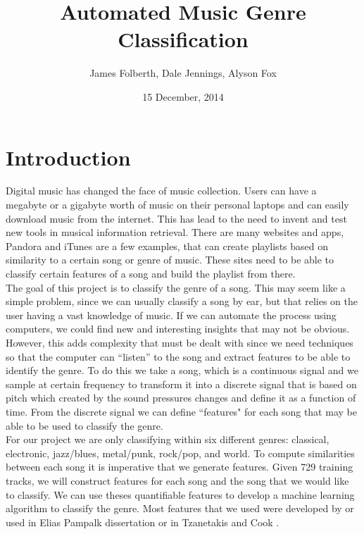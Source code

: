 \documentclass[12pt]{article}
\begin{document}
\title{Automated Music Genre Classification}
\author{James Folberth, Dale Jennings, Alyson Fox}
\date{15 December, 2014}
\maketitle
\section{Introduction}
\indent Digital music has changed the face of music collection. Users can have a megabyte or a gigabyte worth of music on their personal laptops and can easily download music from the internet. This has lead to the need to invent and test new tools in musical information retrieval. There are many websites and apps, Pandora and iTunes are a few examples, that can create playlists based on similarity to a certain song or genre of music. These sites need to be able to classify certain features of a song and build the playlist from there.\\

The goal of this project is to classify the genre of a song. This may seem like a simple problem, since we can usually classify a song by ear, but that relies on the user having a vast knowledge of music. If we can automate the process using computers, we could find new and interesting insights that may not be obvious. However, this adds complexity that must be dealt with since we need techniques so that  the computer can ``listen'' to the song and extract features to be able to identify the genre. To do this we take  a song, which is a continuous signal and we sample at certain frequency to transform it into a discrete signal that is based on pitch which created by the sound pressures changes  and define it as a function of time. From the discrete signal we can define  ``features" for each song that may be able to be used to classify the genre.\\

 For our project we are only classifying within six different genres: classical, electronic, jazz/blues, metal/punk, rock/pop, and world. To compute similarities between each song it is imperative that we generate features. Given 729 training tracks, we will construct features for each song and the song that we would like to classify. We can use theses quantifiable features to develop a machine learning algorithm to classify the genre. Most features that we used were developed by or used in Elias Pampalk dissertation \cite{pampalk:dissertation} or in Tzanetakis and Cook \cite{tzanetakis:classification}.
\end{document}

